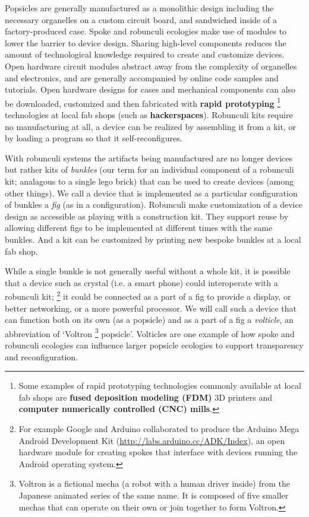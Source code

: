 Popsicles are generally manufactured as a monolithic design including the necessary organelles on a custom circuit board, and sandwiched inside of a factory-produced case. 
Spoke and robunculi ecologies make use of modules to lower the barrier to device design. 
Sharing high-level components reduces the amount of technological knowledge required to create and customize devices.
Open hardware circuit modules abstract away from the complexity of organelles and electronics, and are generally accompanied by online code samples and tutorials. 
Open hardware designs for cases and mechanical components can also be downloaded, customized and then fabricated with \textbf{rapid prototyping}%
\footnote{Some examples of rapid prototyping technologies commonly available at local fab shops are \textbf{fused deposition modeling (FDM)} 3D printers and \textbf{computer numerically controlled (CNC) mills}.}
technologies at local fab shops (such as \textbf{hackerspaces}).
Robunculi kits require no manufacturing at all, a device can be realized by assembling it from a kit, or by loading a program so that it self-reconfigures.

With robunculi systems the artifacts being manufactured are no longer devices but rather kits of \emph{bunkles} (our term for an individual component of a robunculi kit; analagous to a single lego brick) that can be used to create devices (among other things). We call a device that is implemented as a particular configuration of bunkles a \emph{fig} (as in a configuration). Robunculi make customization of a device design as accessible as playing with a construction kit. They support reuse by allowing different figs to be implemented at different times with the same bunkles. And a kit can be customized by printing new bespoke bunkles at a local fab shop.

While a single bunkle is not generally useful without a whole kit, it is possible that a device such as crystal (i.e. a smart phone) could interoperate with a robunculi kit;%
\footnote{For example Google and Arduino collaborated to produce the Arduino Mega Android Development Kit (\url{http://labs.arduino.cc/ADK/Index}), an open hardware module for creating spokes that interface with devices running the Android operating system.}
it could be connected as a part of a fig to provide a display, or better networking, or a more powerful processor.
We will call such a device that can function both on its own (as a popsicle) and as a part of a fig a \emph{volticle}, an abbreviation of `Voltron%
\footnote{Voltron is a fictional mecha (a robot with a human driver inside) from the Japanese animated series of the same name. It is composed of five smaller mechas that can operate on their own or join together to form Voltron.}
popsicle'.
Volticles are one example of how spoke and robunculi ecologies can influence larger popsicle ecologies to support transparency and reconfiguration.

